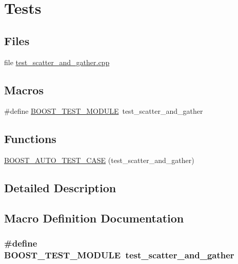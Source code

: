 \hypertarget{group__Tests}{\section{Tests}
\label{group__Tests}
}
\subsection*{Files}
\begin{DoxyCompactItemize}
\item 
file \hyperlink{test__scatter__and__gather_8cpp}{test\-\_\-scatter\-\_\-and\-\_\-gather.\-cpp}
\end{DoxyCompactItemize}
\subsection*{Macros}
\begin{DoxyCompactItemize}
\item 
\#define \hyperlink{group__Tests_ga6b2a3852db8bb19ab6909bac01859985}{B\-O\-O\-S\-T\-\_\-\-T\-E\-S\-T\-\_\-\-M\-O\-D\-U\-L\-E}~test\-\_\-scatter\-\_\-and\-\_\-gather
\end{DoxyCompactItemize}
\subsection*{Functions}
\begin{DoxyCompactItemize}
\item 
\hyperlink{group__Tests_ga8e719c4f477459544627877df12f3a14}{B\-O\-O\-S\-T\-\_\-\-A\-U\-T\-O\-\_\-\-T\-E\-S\-T\-\_\-\-C\-A\-S\-E} (test\-\_\-scatter\-\_\-and\-\_\-gather)
\end{DoxyCompactItemize}


\subsection{Detailed Description}


\subsection{Macro Definition Documentation}
\hypertarget{group__Tests_ga6b2a3852db8bb19ab6909bac01859985}{
\subsubsection[{B\-O\-O\-S\-T\-\_\-\-T\-E\-S\-T\-\_\-\-M\-O\-D\-U\-L\-E}]{\setlength{\rightskip}{0pt plus 5cm}\#define B\-O\-O\-S\-T\-\_\-\-T\-E\-S\-T\-\_\-\-M\-O\-D\-U\-L\-E~test\-\_\-scatter\-\_\-and\-\_\-gather}}\label{group__Tests_ga6b2a3852db8bb19ab6909bac01859985}


